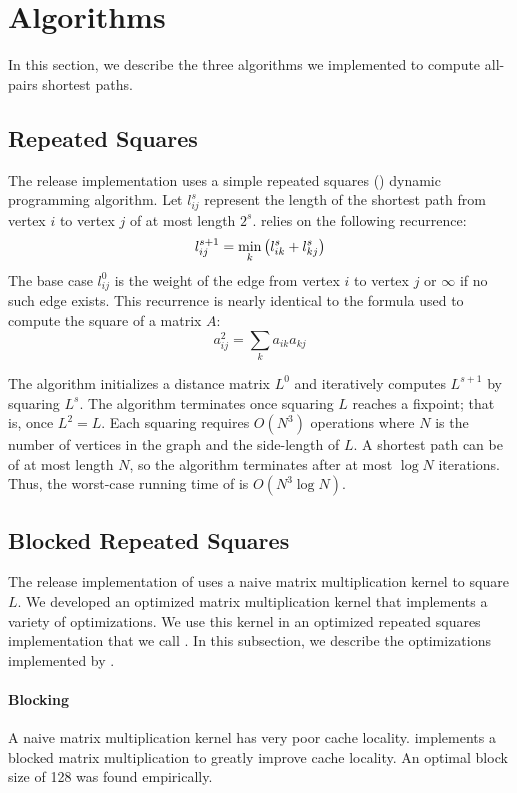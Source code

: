 \section{Algorithms}\label{sec:algo}
In this section, we describe the three algorithms we implemented to compute
all-pairs shortest paths.

\subsection{Repeated Squares}
The release implementation uses a simple repeated squares (\rs) dynamic
programming algorithm. Let $l_{ij}^s$ represent the length of the shortest path
from vertex $i$ to vertex $j$ of at most length $2^s$. \rs{} relies on the
following recurrence:
\[
  l_{ij}^{s+1} = \min_k \left({l_{ik}^s + l_{kj}^s}\right)
\]
The base case $l_{ij}^0$ is the weight of the edge from vertex $i$ to vertex
$j$ or $\infty$ if no such edge exists. This recurrence is nearly identical to
the formula used to compute the square of a matrix $A$:
\[
  a_{ij}^2 = \sum_k a_{ik} a_{kj}
\]

The algorithm initializes a distance matrix $L^0$ and iteratively computes
$L^{s+1}$ by squaring $L^s$. The algorithm terminates once squaring $L$ reaches
a fixpoint; that is, once $L^2 = L$. Each squaring requires $O(N^3)$ operations
where $N$ is the number of vertices in the graph and the side-length of $L$. A
shortest path can be of at most length $N$, so the algorithm terminates after
at most $\log N$ iterations. Thus, the worst-case running time of \rs{} is
$O(N^3 \log N)$.

\subsection{Blocked Repeated Squares}
The release implementation of \rs{} uses a naive matrix multiplication kernel
to square $L$. We developed an optimized matrix multiplication kernel that
implements a variety of optimizations. We use this kernel in an optimized
repeated squares implementation that we call \block{}. In this subsection, we
describe the optimizations implemented by \block{}.

\paragraph{Blocking}
A naive matrix multiplication kernel has very poor cache locality. \block{}
implements a blocked matrix multiplication to greatly improve cache locality.
An optimal block size of 128 was found empirically.

